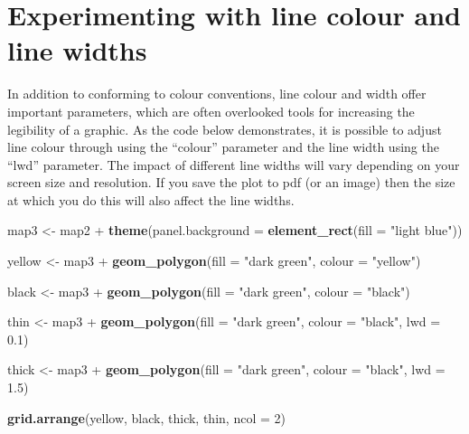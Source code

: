 \documentclass[]{article}
\newenvironment{Shaded}{}{}
\newcommand{\KeywordTok}[1]{\textcolor[rgb]{0.00,0.44,0.13}{\textbf{{#1}}}}
\newcommand{\DataTypeTok}[1]{\textcolor[rgb]{0.56,0.13,0.00}{{#1}}}
\newcommand{\DecValTok}[1]{\textcolor[rgb]{0.25,0.63,0.44}{{#1}}}
\newcommand{\FloatTok}[1]{\textcolor[rgb]{0.25,0.63,0.44}{{#1}}}
\newcommand{\StringTok}[1]{\textcolor[rgb]{0.25,0.44,0.63}{{#1}}}
\newcommand{\NormalTok}[1]{{#1}}
\begin{document}
\section{Experimenting with line colour and line widths}

In addition to conforming to colour conventions, line colour and width
offer important parameters, which are often overlooked tools for
increasing the legibility of a graphic. As the code below demonstrates,
it is possible to adjust line colour through using the ``colour''
parameter and the line width using the ``lwd'' parameter. The impact of
different line widths will vary depending on your screen size and
resolution. If you save the plot to pdf (or an image) then the size at
which you do this will also affect the line widths.

\begin{Shaded}
\begin{Highlighting}[]
\NormalTok{map3 <-}\StringTok{ }\NormalTok{map2 +}\StringTok{ }\KeywordTok{theme}\NormalTok{(}\DataTypeTok{panel.background =} \KeywordTok{element_rect}\NormalTok{(}\DataTypeTok{fill =} \StringTok{"light blue"}\NormalTok{))}

\NormalTok{yellow <-}\StringTok{ }\NormalTok{map3 +}\StringTok{ }\KeywordTok{geom_polygon}\NormalTok{(}\DataTypeTok{fill =} \StringTok{"dark green"}\NormalTok{, }\DataTypeTok{colour =} \StringTok{"yellow"}\NormalTok{)}

\NormalTok{black <-}\StringTok{ }\NormalTok{map3 +}\StringTok{ }\KeywordTok{geom_polygon}\NormalTok{(}\DataTypeTok{fill =} \StringTok{"dark green"}\NormalTok{, }\DataTypeTok{colour =} \StringTok{"black"}\NormalTok{)}

\NormalTok{thin <-}\StringTok{ }\NormalTok{map3 +}\StringTok{ }\KeywordTok{geom_polygon}\NormalTok{(}\DataTypeTok{fill =} \StringTok{"dark green"}\NormalTok{, }\DataTypeTok{colour =} \StringTok{"black"}\NormalTok{, }\DataTypeTok{lwd =} \FloatTok{0.1}\NormalTok{)}

\NormalTok{thick <-}\StringTok{ }\NormalTok{map3 +}\StringTok{ }\KeywordTok{geom_polygon}\NormalTok{(}\DataTypeTok{fill =} \StringTok{"dark green"}\NormalTok{, }\DataTypeTok{colour =} \StringTok{"black"}\NormalTok{, }\DataTypeTok{lwd =} \FloatTok{1.5}\NormalTok{)}

\KeywordTok{grid.arrange}\NormalTok{(yellow, black, thick, thin, }\DataTypeTok{ncol =} \DecValTok{2}\NormalTok{)}
\end{Highlighting}
\end{Shaded}
\end{document}
